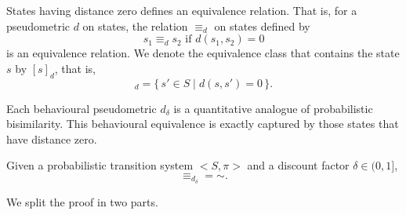 \documentclass{LMCS}
\begin{document}
States having distance zero defines an equivalence relation.  That is,
for a pseudometric $d$ on states, the relation $\equiv_d$ on states 
defined by
\begin{displaymath}
s_1 \equiv_d s_2 \mbox{ if } d(s_1, s_2) = 0
\end{displaymath}
is an equivalence relation.  We denote the equivalence class that
contains the state $s$ by $[s]_d$, that is,
\begin{displaymath}
[s]_d = \{\, s' \in S \mid d(s, s') = 0 \,\}.
\end{displaymath}

Each behavioural pseudometric $d_{\delta}$ is a quantitative analogue
of probabilistic bisimilarity.  This behavioural equivalence is
exactly captured by those states that have distance zero.

\begin{prop}
\label{proposition:2}
Given a probabilistic transition system $<S, \pi>$ and
a discount factor $\delta \in (0, 1]$, 
\begin{displaymath}
\mathord{\equiv_{d_{\delta}}} = \mathord{\sim}.
\end{displaymath}
\end{prop}
\proof We split the proof in two parts.
\end{document}
